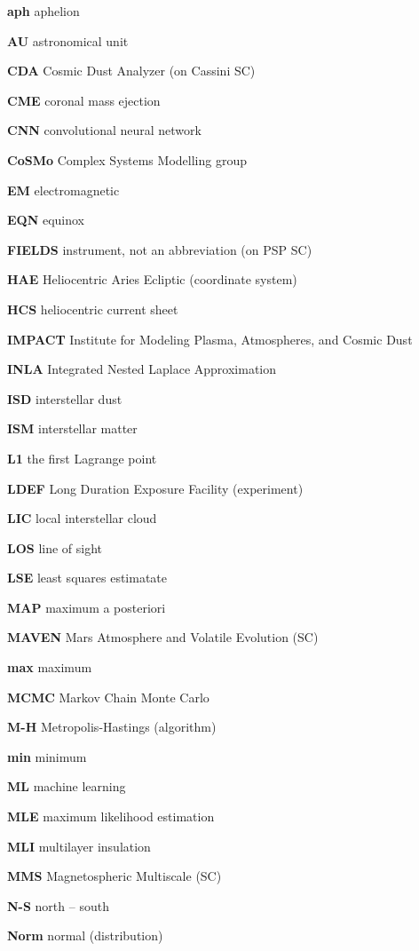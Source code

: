 \noindent

\textbf{aph} aphelion

\textbf{AU} astronomical unit

\textbf{CDA} Cosmic Dust Analyzer (on Cassini SC)

\textbf{CME} coronal mass ejection

\textbf{CNN} convolutional neural network

\textbf{CoSMo} Complex Systems Modelling group

\textbf{EM} electromagnetic

\textbf{EQN} equinox

\textbf{FIELDS} instrument, not an abbreviation (on PSP SC)

\textbf{HAE} Heliocentric Aries Ecliptic (coordinate system)

\textbf{HCS} heliocentric current sheet

\textbf{IMPACT} Institute for Modeling Plasma, Atmospheres, and Cosmic Dust

\textbf{INLA} Integrated Nested Laplace Approximation

\textbf{ISD} interstellar dust

\textbf{ISM} interstellar matter

\textbf{L1} the first Lagrange point

\textbf{LDEF} Long Duration Exposure Facility (experiment)

\textbf{LIC} local interstellar cloud

\textbf{LOS} line of sight

\textbf{LSE} least squares estimatate

\textbf{MAP} maximum a posteriori

\textbf{MAVEN}  Mars Atmosphere and Volatile Evolution (SC)

\textbf{max} maximum

\textbf{MCMC} Markov Chain Monte Carlo

\textbf{M-H} Metropolis-Hastings (algorithm)

\textbf{min} minimum

\textbf{ML} machine learning

\textbf{MLE} maximum likelihood estimation

\textbf{MLI} multilayer insulation

\textbf{MMS} Magnetospheric Multiscale (SC)

\textbf{N-S} north -- south

\textbf{Norm} normal (distribution) 

